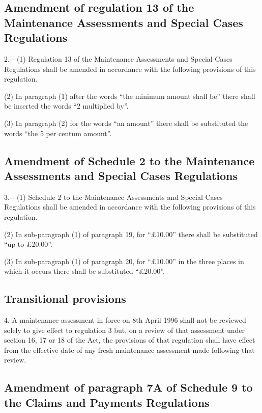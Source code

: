 \documentclass[a4paper]{article}
\begin{document}
\subsection[2. Amendment of regulation 13 of the Maintenance Assessments and Special Cases Regulations]{Amendment of regulation 13 of the Maintenance Assessments and Special Cases Regulations}

2.—(1) Regulation 13 of the Maintenance Assessments and Special Cases Regulations shall be amended in accordance with the following provisions of this regulation.

(2) In paragraph (1) after the words “the minimum amount shall be” there shall be inserted the words “2 multiplied by”.

(3) In paragraph (2) for the words “an amount” there shall be substituted the words “the 5 per centum amount”.

\subsection[3. Amendment of Schedule 2 to the Maintenance Assessments and Special Cases Regulations]{Amendment of Schedule 2 to the Maintenance Assessments and Special Cases Regulations}

3.—(1) Schedule 2 to the Maintenance Assessments and Special Cases Regulations shall be amended in accordance with the following provisions of this regulation.

(2) In sub-paragraph (1) of paragraph 19, for “£10.00” there shall be substituted “up to £20.00”.

(3) In sub-paragraph (1) of paragraph 20, for “£10.00” in the three places in which it occurs there shall be substituted “£20.00”.

\subsection[4. Transitional provisions]{Transitional provisions}

4.  A maintenance assessment in force on 8th April 1996 shall not be reviewed solely to give effect to regulation 3 but, on a review of that assessment under section 16, 17 or 18 of the Act, the provisions of that regulation shall have effect from the effective date of any fresh maintenance assessment made following that review.

\subsection[5. Amendment of paragraph 7A of Schedule 9 to the Claims and Payments Regulations]{Amendment of paragraph 7A of Schedule 9 to the Claims and Payments Regulations}
\end{document}
